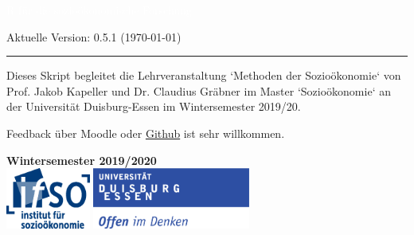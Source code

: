\documentclass[letterpaper]{article}
\author{%
    Dr. Claudius Gräbner \\
    Institut für Sozioökonomie \\
    Universität Duisburg-Essen\\
    \href{mailto:claudius.graebner@uni-due.com}{claudius.graebner@uni-due.com}\\
    \href{www.claudius-graebner.com}{https://claudius-graebner.com/}
    }
\makeatletter
\def\printauthor{%
    {\large \@author}}
\makeatother
\begin{document}
\begin{titlepage}
\BgThispage
{}
\vspace*{2cm}
\noindent
\onehalfspacing
\textcolor{white}{\bigsf R für die \mbox{sozioökonomische} Forschung}
\vspace*{1.2cm}\par
Aktuelle Version: 0.5.1 (\today)\\
\vspace*{2.0cm}\par
\noindent
\begin{minipage}{0.35\linewidth}
    \begin{flushright}
        \printauthor
    \end{flushright}
\end{minipage} \hspace{15pt}
%
\begin{minipage}{0.02\linewidth}
    \rule{1pt}{175pt}
\end{minipage} \hspace{-10pt}
%
\begin{minipage}{0.6\linewidth}
\vspace{5pt}
\begin{adjustwidth}{25pt}{25pt}
\raggedright
Dieses Skript begleitet die Lehrveranstaltung `Methoden der Sozioökonomie` von
Prof. Jakob Kapeller und Dr. Claudius Gräbner im Master `Sozioökonomie` an der
Universität Duisburg-Essen im Wintersemester 2019/20.

Feedback über Moodle oder
\href{https://github.com/graebnerc/RforSocioEcon}{Github} ist
sehr willkommen.
\end{adjustwidth}

\end{minipage}

\vspace{0.25cm}
\centering
\vspace{1.25cm}
\textbf{Wintersemester 2019/2020}\\
\vfill
\includegraphics[height=2cm]{ifso_logo_dt_RGB} \hspace{2cm}
\includegraphics[height=2cm]{logo_ude.pdf}
\end{titlepage}
\end{document}
